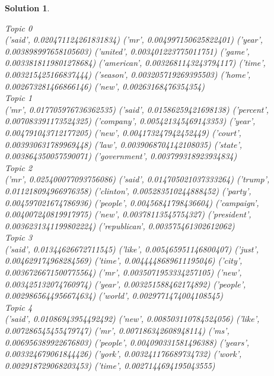 \documentclass[a4paper,UTF8]{article}
\newtheorem*{solution}{Solution}
\numberwithin{equation}{section}
\begin{document}
\begin{solution}
\begin{enumerate}
	Topic 0 \\
	('said', 0.020471124261831834) ('mr', 0.004997150625822401) ('year', 0.003898997658105603) ('united', 0.003401223775011751) ('game', 0.0033818119801278684) ('american', 0.0032681143243794117) ('time', 0.003215425166837444) ('season', 0.003205719269395503) ('home', 0.002673281466866146) ('new', 0.00263168476354354) \\
	Topic 1 \\
	('mr', 0.017705976736362535) ('said', 0.01586259421698138) ('percent', 0.007083391173524325) ('company', 0.005421345469143353) ('year', 0.004791043712177205) ('new', 0.004173247942452449) ('court', 0.003930631789969448) ('law', 0.0039068704142108035) ('state', 0.003864350057590071) ('government', 0.003799318923934834) \\
	Topic 2 \\
	('mr', 0.025400077093756086) ('said', 0.014705021037333264) ('trump', 0.011218094966976358) ('clinton', 0.005283510244888452) ('party', 0.004597021674786936) ('people', 0.00456841798436604) ('campaign', 0.004007240819917975) ('new', 0.00378113545754327) ('president', 0.0036231341199802224) ('republican', 0.003575461302612062) \\
	Topic 3 \\
	('said', 0.01344626672711545) ('like', 0.005465951146800407) ('just', 0.004629174968284569) ('time', 0.0044448689611195046) ('city', 0.0036726671500775564) ('mr', 0.0035071953334257105) ('new', 0.003425132074760974) ('year', 0.003251588462174892) ('people', 0.0029865644956674634) ('world', 0.0029771474004108545) \\
	Topic 4 \\
	('said', 0.01086943954492492) ('new', 0.008503110784524056) ('like', 0.007286545455479747) ('mr', 0.007186342608948114) ('ms', 0.006956389922676803) ('people', 0.004090331581496388) ('years', 0.003324679061844426) ('york', 0.003241176689734732) ('work', 0.002918729068203453) ('time', 0.0027144694195043555) \\
\end{enumerate}
\end{solution}
\newpage


\end{document}
